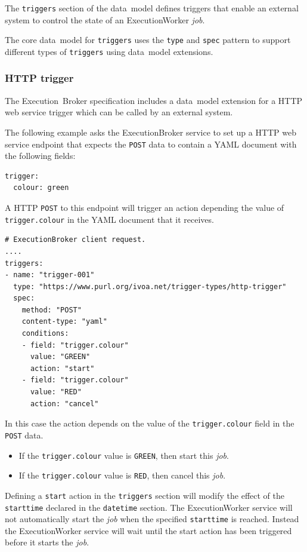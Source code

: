 \documentclass[11pt,a4paper]{ivoa}
\newcommand{\yaml} {YAML}
\newcommand{\http} {HTTP}
\newcommand{\datamodel} {data~model}
\newcommand{\webservice} {web service}
\newcommand{\execbrokerclass} {ExecutionBroker}
\newcommand{\execworkerclass} {ExecutionWorker}
\newcommand{\executionbroker} {Execution~Broker}
\newcommand{\codeword}[1] {\texttt{#1}}
\newcommand{\job} {\textit{job}}
\begin{document}
The \codeword{triggers} section of the \datamodel{} defines triggers that
enable an external system to control the state of an \execworkerclass{} \job{}.

The core \datamodel{} for \codeword{triggers} uses the \codeword{type} and
\codeword{spec} pattern to support different types of \codeword{triggers}
using \datamodel{} extensions.

\subsubsection{HTTP trigger}
\label{http-trigger}

The \executionbroker{} specification includes a \datamodel{} extension for
a \http{} \webservice{} trigger which can be called by an external system.

The following example asks the \execbrokerclass{} service to set up a \http{} \webservice{}
endpoint that expects the \codeword{POST} data to contain a \yaml{} document with the
following fields:

\begin{lstlisting}[]
trigger:
  colour: green
\end{lstlisting}

A \http{} \codeword{POST} to this endpoint will trigger an action depending the value of
\codeword{trigger.colour} in the \yaml{} document that it receives.

\begin{lstlisting}[]
# ExecutionBroker client request.
....
triggers:
- name: "trigger-001"
  type: "https://www.purl.org/ivoa.net/trigger-types/http-trigger"
  spec:
    method: "POST"
    content-type: "yaml"
    conditions:
    - field: "trigger.colour"
      value: "GREEN"
      action: "start"
    - field: "trigger.colour"
      value: "RED"
      action: "cancel"
\end{lstlisting}

In this case the action depends on the value of the \codeword{trigger.colour} field in the \codeword{POST} data.
\begin{itemize}
    \item If the \codeword{trigger.colour} value is \codeword{GREEN}, then start this \job{}.
    \item If the \codeword{trigger.colour} value is \codeword{RED}, then cancel this \job{}.
\end{itemize}

Defining a \codeword{start} action in the \codeword{triggers} section will modify the effect of the
\codeword{starttime} declared in the \codeword{datetime} section.
The \execworkerclass{} service will not automatically start the \job{} when the specified \codeword{starttime} is reached.
Instead the \execworkerclass{} service will wait until the start action has been triggered before it starts the \job{}.
\end{document}
